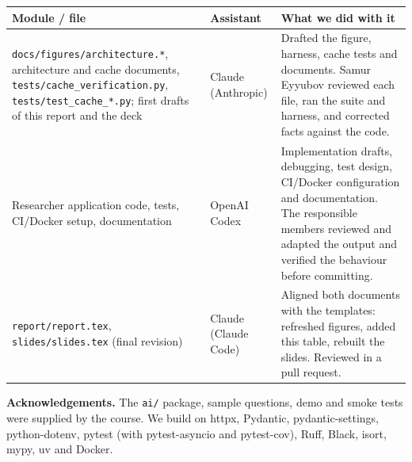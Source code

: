\documentclass[11pt,a4paper]{article}
\newcommand{\cmd}[1]{\texttt{#1}}
\begin{document}
\begin{center}\footnotesize
\begin{tabularx}{\textwidth}{@{}>{\raggedright\arraybackslash}p{}>{\raggedright\arraybackslash}p{}X@{}}
\toprule
\textbf{Module / file} & \textbf{Assistant} & \textbf{What we did with it} \\
\midrule
\cmd{docs/figures/architecture.*}, architecture and cache documents,
\cmd{tests/cache\_verification.py}, \cmd{tests/test\_cache\_*.py}; first drafts of
this report and the deck & Claude (Anthropic) &
Drafted the figure, harness, cache tests and documents. Samur Eyyubov reviewed
each file, ran the suite and harness, and corrected facts against the code. \\
Researcher application code, tests, CI/Docker setup, documentation & OpenAI Codex &
Implementation drafts, debugging, test design, CI/Docker configuration and
documentation. The responsible members reviewed and adapted the output and
verified the behaviour before committing. \\
\cmd{report/report.tex}, \cmd{slides/slides.tex} (final revision) & Claude (Claude Code) &
Aligned both documents with the templates: refreshed figures, added this
table, rebuilt the slides. Reviewed in a pull request. \\
\bottomrule
\end{tabularx}
\end{center}

\textbf{Acknowledgements.} The \texttt{ai/} package, sample questions, demo and
smoke tests were supplied by the course. We build on httpx, Pydantic,
pydantic-settings, python-dotenv, pytest (with pytest-asyncio and pytest-cov),
Ruff, Black, isort, mypy, uv and Docker.

\end{document}
